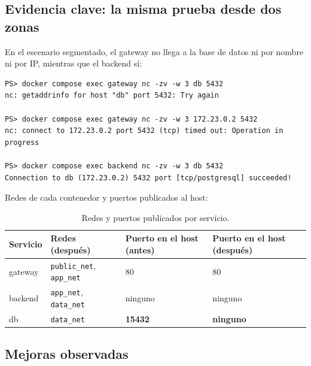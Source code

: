 \documentclass[11pt,letterpaper]{article}
\newcommand{\code}[1]{\texttt{#1}}
\newcommand{\ok}[1]{\textcolor{verde}{\textbf{#1}}}
\newcommand{\bad}[1]{\textcolor{rojo}{\textbf{#1}}}
\begin{document}
\subsection{Evidencia clave: la misma prueba desde dos zonas}

En el escenario segmentado, el gateway no llega a la base de datos ni por nombre ni
por IP, mientras que el backend sí:

\begin{lstlisting}[language=shell]
PS> docker compose exec gateway nc -zv -w 3 db 5432
nc: getaddrinfo for host "db" port 5432: Try again

PS> docker compose exec gateway nc -zv -w 3 172.23.0.2 5432
nc: connect to 172.23.0.2 port 5432 (tcp) timed out: Operation in progress

PS> docker compose exec backend nc -zv -w 3 db 5432
Connection to db (172.23.0.2) 5432 port [tcp/postgresql] succeeded!
\end{lstlisting}

Redes de cada contenedor y puertos publicados al host:

\begin{table}[H]
\centering
\small
\begin{tabularx}{\textwidth}{l Y l l}
\toprule
{}
\textbf{Servicio} & \textbf{Redes (después)} & \textbf{Puerto en el host (antes)} & \textbf{Puerto en el host (después)} \\
\midrule
gateway & \code{public\_net}, \code{app\_net} & 80 & 80 \\
backend & \code{app\_net}, \code{data\_net}   & ninguno & ninguno \\
db      & \code{data\_net}                    & \bad{15432} & \ok{ninguno} \\
\bottomrule
\end{tabularx}
\caption{Redes y puertos publicados por servicio.}
\end{table}

\subsection{Mejoras observadas}
\end{document}
